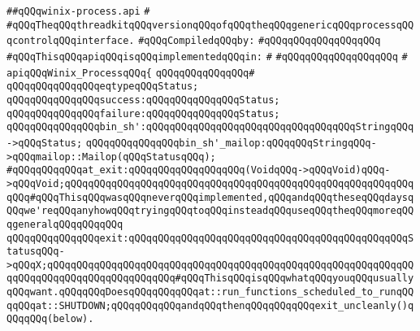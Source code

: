\label{src/lib/src/lib/thread-kit/src/winix/winix-process.api}
\verb|##qQQqwinix-process.api|\newline
\verb|#|\newline
\verb|#qQQqTheqQQqthreadkitqQQqversionqQQqofqQQqtheqQQqgenericqQQqprocessqQQqcontrolqQQqinterface.|\newline
\newline
\verb|#qQQqCompiledqQQqby:|\newline
\verb|#qQQqqQQqqQQqqQQqqQQq|\newline
\newline
\newline
\newline
\newline
\verb|#qQQqThisqQQqapiqQQqisqQQqimplementedqQQqin:|\newline
\verb|#|\newline
\verb|#qQQqqQQqqQQqqQQqqQQq|\newline
\verb|#|\newline
\verb|apiqQQqWinix_ProcessqQQq{|\newline
\verb|qQQqqQQqqQQqqQQq#|\newline
\verb|qQQqqQQqqQQqqQQqeqtypeqQQqStatus;|\newline
\newline
\verb|qQQqqQQqqQQqqQQqsuccess:qQQqqQQqqQQqqQQqStatus;|\newline
\verb|qQQqqQQqqQQqqQQqfailure:qQQqqQQqqQQqqQQqStatus;|\newline
\newline
\verb|qQQqqQQqqQQqqQQqbin_sh':qQQqqQQqqQQqqQQqqQQqqQQqqQQqqQQqqQQqStringqQQq->qQQqStatus;|\newline
\verb|qQQqqQQqqQQqqQQqbin_sh'_mailop:qQQqqQQqStringqQQq->qQQqmailop::Mailop(qQQqStatusqQQq);|\newline
\newline
\verb|#qQQqqQQqqQQqat_exit:qQQqqQQqqQQqqQQqqQQq(VoidqQQq->qQQqVoid)qQQq->qQQqVoid;qQQqqQQqqQQqqQQqqQQqqQQqqQQqqQQqqQQqqQQqqQQqqQQqqQQqqQQqqQQqqQQq#qQQqThisqQQqwasqQQqneverqQQqimplemented,qQQqandqQQqtheseqQQqdaysqQQqwe'reqQQqanyhowqQQqtryingqQQqtoqQQqinsteadqQQquseqQQqtheqQQqmoreqQQqgeneralqQQqqQQqqQQq|\newline
\newline
\verb|qQQqqQQqqQQqqQQqexit:qQQqqQQqqQQqqQQqqQQqqQQqqQQqqQQqqQQqqQQqqQQqqQQqStatusqQQq->qQQqX;qQQqqQQqqQQqqQQqqQQqqQQqqQQqqQQqqQQqqQQqqQQqqQQqqQQqqQQqqQQqqQQqqQQqqQQqqQQqqQQqqQQqqQQqqQQq#qQQqThisqQQqisqQQqwhatqQQqyouqQQqusuallyqQQqwant.qQQqqQQqDoesqQQqqQQqqQQqat::run_functions_scheduled_to_runqQQqqQQqat::SHUTDOWN;qQQqqQQqqQQqandqQQqthenqQQqqQQqqQQqexit_uncleanly()qQQqqQQq(below).|\newline
